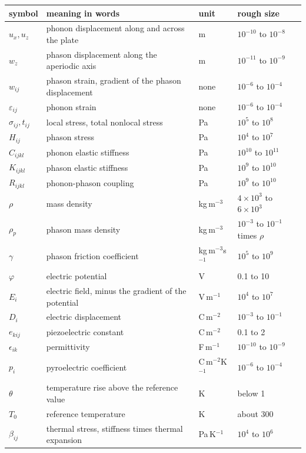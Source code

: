 \documentclass[11pt]{article}
\begin{document}
\begin{center}
\small
\begin{tabular}{p{1.9cm}p{6.0cm}p{2.4cm}p{2.6cm}}
\toprule
symbol & meaning in words & unit & rough size\\
\midrule
$u_x,u_z$ & phonon displacement along and across the plate & m & $10^{-10}$ to $10^{-8}$\\
$w_z$ & phason displacement along the aperiodic axis & m & $10^{-11}$ to $10^{-9}$\\
$w_{ij}$ & phason strain, gradient of the phason displacement & none & $10^{-6}$ to $10^{-4}$\\
$\varepsilon_{ij}$ & phonon strain & none & $10^{-6}$ to $10^{-4}$\\
$\sigma_{ij},t_{ij}$ & local stress, total nonlocal stress & Pa & $10^{5}$ to $10^{8}$\\
$H_{ij}$ & phason stress & Pa & $10^{4}$ to $10^{7}$\\
$C_{ijkl}$ & phonon elastic stiffness & Pa & $10^{10}$ to $10^{11}$\\
$K_{ijkl}$ & phason elastic stiffness & Pa & $10^{9}$ to $10^{10}$\\
$R_{ijkl}$ & phonon-phason coupling & Pa & $10^{9}$ to $10^{10}$\\
$\rho$ & mass density & kg\,m$^{-3}$ & $4\times10^{3}$ to $6\times10^{3}$\\
$\rho_p$ & phason mass density & kg\,m$^{-3}$ & $10^{-3}$ to $10^{-1}$ times $\rho$\\
$\gamma$ & phason friction coefficient & kg\,m$^{-3}$s$^{-1}$ & $10^{5}$ to $10^{9}$\\
$\varphi$ & electric potential & V & 0.1 to 10\\
$E_i$ & electric field, minus the gradient of the potential & V\,m$^{-1}$ & $10^{4}$ to $10^{7}$\\
$D_i$ & electric displacement & C\,m$^{-2}$ & $10^{-3}$ to $10^{-1}$\\
$e_{kij}$ & piezoelectric constant & C\,m$^{-2}$ & 0.1 to 2\\
$\epsilon_{ik}$ & permittivity & F\,m$^{-1}$ & $10^{-10}$ to $10^{-9}$\\
$p_i$ & pyroelectric coefficient & C\,m$^{-2}$K$^{-1}$ & $10^{-6}$ to $10^{-4}$\\
$\theta$ & temperature rise above the reference value & K & below 1\\
$T_0$ & reference temperature & K & about 300\\
$\beta_{ij}$ & thermal stress, stiffness times thermal expansion & Pa\,K$^{-1}$ & $10^{4}$ to $10^{6}$\\

\end{tabular}
\end{center}
\end{document}
